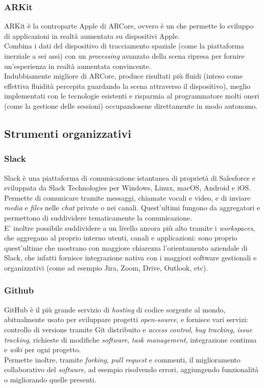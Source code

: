 \subsubsection{ARKit}
ARKit è la controparte Apple di ARCore, ovvero è un \sdk{} che permette lo sviluppo di applicazioni in realtà aumentata su dispositivi Apple.\\
Combina i dati del dispositivo di tracciamento spaziale (come la piattaforma inerziale a sei assi) con un \textit{processing} avanzato della scena ripresa per fornire un'esperienza in realtà aumentata convincente.\\
Indubbiamente migliore di ARCore, produce risultati più fluidi (inteso come effettiva fluidità percepita guardando la scena attraverso il dispositivo), meglio implementati con le tecnologie esistenti e risparmia al programmatore molti oneri (come la gestione delle sessioni) occupandosene direttamente in modo autonomo.
\subsection{Strumenti organizzativi}

\subsubsection{Slack}
Slack è una piattaforma di comunicazione istantanea di proprietà di Salesforce e sviluppata da Slack Technologies per Windows, Linux, macOS, Android e iOS.\\
Permette di comunicare tramite messaggi, chiamate vocali e video, e di inviare \textit{media} e \textit{files} nelle \textit{chat} private o nei canali. Quest'ultimi fungono da aggregatori e permettono di suddividere tematicamente la comunicazione.\\
E' inoltre possibile suddividere a un livello ancora più alto tramite i \textit{workspaces}, che aggregano al proprio interno utenti, canali e applicazioni: sono proprio quest'ultime che mostrano con maggiore chiarezza l'orientamento aziendale di Slack, che infatti fornisce integrazione nativa con i maggiori software gestionali e organizzativi (come ad esempio Jira, Zoom, Drive, Outlook, etc).

\subsubsection{Github}
GitHub è il più grande servizio di \textit{hosting} di codice sorgente al mondo, abitualmente usato per sviluppare progetti \textit{open-source}, e fornisce vari servizi: controllo di versione tramite Git distribuito e \textit{access control}, \textit{bug tracking}, \textit{issue tracking}, richieste di modifiche \textit{software}, \textit{task management}, integrazione continua e \textit{wiki} per ogni progetto.\\ 
Permette inoltre, tramite \textit{forking}, \textit{pull request} e commenti, il miglioramento collaborativo del \textit{software}, ad esempio risolvendo errori, aggiungendo funzionalità o migliorando quelle presenti.

